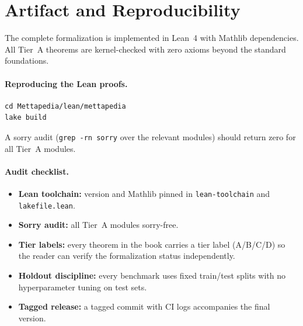 \section{Artifact and Reproducibility}
\label{sec:artifact}

The complete formalization is implemented in Lean~4 with Mathlib
dependencies.  All Tier~A theorems are kernel-checked with zero axioms
beyond the standard foundations.

\paragraph{Reproducing the Lean proofs.}

\begin{lstlisting}
cd Mettapedia/lean/mettapedia
lake build
\end{lstlisting}

\noindent
A sorry audit (\texttt{grep -rn sorry} over the relevant modules)
should return zero for all Tier~A modules.

\paragraph{Audit checklist.}
\begin{itemize}
\item \textbf{Lean toolchain:} version and Mathlib pinned in
  \texttt{lean-toolchain} and \texttt{lakefile.lean}.
\item \textbf{Sorry audit:} all Tier~A modules sorry-free.
\item \textbf{Tier labels:} every theorem in the book carries a tier
  label (A/B/C/D) so the reader can verify the formalization status
  independently.
\item \textbf{Holdout discipline:} every benchmark uses fixed
  train/test splits with no hyperparameter tuning on test sets.
\item \textbf{Tagged release:} a tagged commit with CI logs
  accompanies the final version.
\end{itemize}


